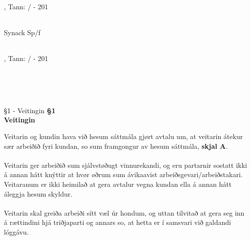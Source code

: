 \begin{titlepage}
\noindent
\begin{minipage}{0.5\textwidth}
	\begin{center}
		\SynackUnderskriftsLokation, Tann:\underline{\hspace{4mm}} / \underline{\hspace{4mm}} - 201\underline{\hspace{2mm}}	\\ \vspace{5mm}
		
		\underline{\hspace{62mm}}	\\
		Synack Sp/f \\
		\SynackUnderskriver \\
	\end{center}
\end{minipage}
\begin{minipage}{0.5\textwidth}
	\begin{center}
		\SynackUnderskriftsLokation, Tann:\underline{\hspace{4mm}} / \underline{\hspace{4mm}} - 201\underline{\hspace{2mm}}	\\ \vspace{5mm}
		
		\underline{\hspace{62mm}}	\\
		\Kunden \\
		\KundenKontakt \\
	\end{center}
\end{minipage}
\end{titlepage}
\renewcommand{\cftsecleader}{\cftdotfill{\cftdotsep}}
\newpage
\tableofcontents

\newpage

\begin{center}
	 {§1 - Veitingin}
	\textbf{§1 \\ Veitingin}
\end{center}
Veitarin og kundin hava við hesum sáttmála gjørt avtalu um, at veitarin átekur sær arbeiðið fyri kundan, so sum framgongur av hesum sáttmála, \textbf{skjal A}. \\ \\
Veitarin ger arbeiðið sum sjálvstøðugt vinnurekandi, og eru partarnir sostatt ikki á annan hátt knýttir at hvør øðrum sum ávikaavist arbeiðsgevari/arbeiðstakari. Veitaranum er ikki heimilað at gera avtalur vegna kundan ella á annan hátt áleggja hesum skyldur. \\ \\
Veitarin skal greiða arbeiði sítt væl úr hondum, og uttan tilvitað at gera seg inn á rættindini hjá triðjaparti og annars so, at hetta er í samsvari við galdandi lóggávu. 

